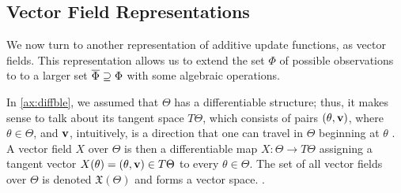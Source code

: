 


% 


\subsection{Vector Field Representations}
\label{sec:vecrep}

We now turn to another representation of additive 
update functions, as vector fields. 
This representation allows us to extend the set $\Phi$ of possible observations to 
to a larger set $\overline \Phi \supseteq \Phi$ with some algebraic operations.  

In \cref{ax:diffble}, we assumed that $\Theta$ has a differentiable 
structure; thus, it makes sense to talk about its tangent space
$T\Theta$,
which consists of pairs $(\theta, \mathbf{v})$, where
$\theta \in \Theta$, and $\mathbf{v}$,
intuitively, is a direction that one can travel in $\Theta$ beginning at $\theta$
\parencite[\S3]{lee2013smooth}.
%
%
A vector field $X$ over $\Theta$ is then
a 
differentiable
map $X : \Theta \to T \Theta$ 
assigning a tangent vector $X(\theta) = (\theta, \mathbf{v}) \in T\Theta$ 
to every $\theta \in \Theta$.
The set of all vector fields over $\Theta$ is denoted $\mathfrak X(\Theta)$
 and forms a vector space.
\parencite[\S8]{lee2013smooth}
\unskip.

